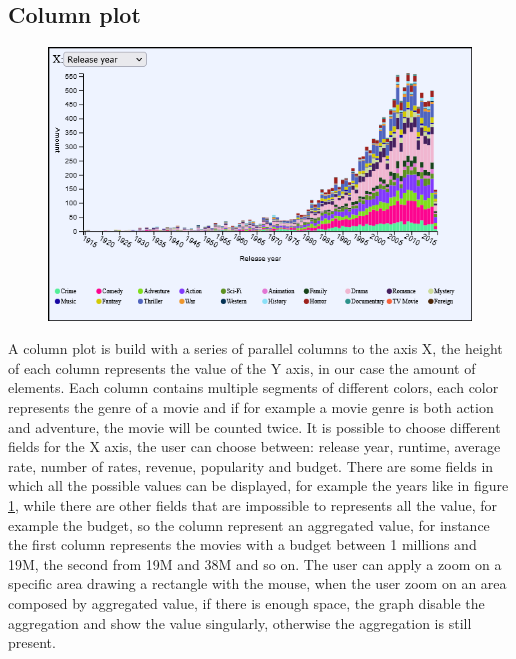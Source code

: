 \documentclass[]{article}
\begin{document}
\subsection{Column plot}
\begin{figure}[H]
	\centering
	\includegraphics[width=1\linewidth]{images/column_plot}
	\caption[Column plot]{}
	\label{fig:columnplot}
\end{figure}
A column plot is build with a series of parallel columns to the axis X, the height of each column represents the value of the Y axis, in our case the amount of elements.\newline
Each column contains multiple segments of different colors, each color represents the genre of a movie and if for example a movie genre is both action and adventure, the movie will be counted twice.\newline
It is possible to choose different fields for the X axis, the user can choose between: release year, runtime, average rate, number of rates, revenue, popularity and budget. There are some fields in which all the possible values can be displayed, for example the years like in figure \ref{fig:columnplot}, while there are other fields that are impossible to represents all the value, for example the budget, so the column represent an aggregated value, for instance the first column represents the movies with a budget between 1 millions and 19M, the second from 19M and 38M and so on. The user can apply a zoom on a specific area drawing a rectangle with the mouse, when the user zoom on an area composed by aggregated value, if there is enough space, the graph disable the aggregation and show the value singularly, otherwise the aggregation is still present.
\end{document}
